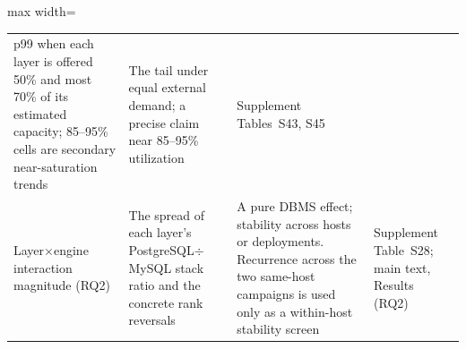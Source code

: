 \begin{table}[htbp]
\begin{adjustbox}{max width=\textwidth}
\begin{tabular}{@{}p{2.7cm} p{4.0cm} p{4.0cm} p{2.7cm}@{}}
    p99 when each layer is offered 50\% and most 70\% of its estimated capacity; 85--95\% cells are secondary near-saturation trends &
    The tail under equal external demand; a precise claim near 85--95\% utilization &
    Supplement Tables~S43, S45 \\
    \addlinespace
    Layer$\times$engine interaction magnitude (RQ2) &
    The spread of each layer's PostgreSQL$\div$MySQL stack ratio and the concrete rank reversals &
    A pure DBMS effect; stability across hosts or deployments. Recurrence across the two same-host campaigns is used only as a within-host stability screen &
    Supplement Table~S28; main text, Results (RQ2) \\
    \bottomrule
  \end{tabular}
  \end{adjustbox}
\end{table}
